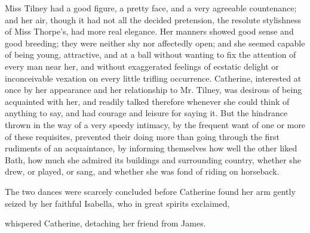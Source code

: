 Miss Tilney had a good figure, a pretty face, and a very agreeable countenance; and her air, though it had not all the decided pretension, the resolute stylishness of Miss Thorpe's, had more real elegance. Her manners showed good sense and good breeding; they were neither shy nor affectedly open; and she seemed capable of being young, attractive, and at a ball without wanting to fix the attention of every man near her, and without exaggerated feelings of ecstatic delight or inconceivable vexation on every little trifling occurrence. Catherine, interested at once by her appearance and her relationship to Mr. Tilney, was desirous of being acquainted with her, and readily talked therefore whenever she could think of anything to say, and had courage and leisure for saying it. But the hindrance thrown in the way of a very speedy intimacy, by the frequent want of one or more of these requisites, prevented their doing more than going through the first rudiments of an acquaintance, by informing themselves how well the other liked Bath, how much she admired its buildings and surrounding country, whether she drew, or played, or sang, and whether she was fond of riding on horseback.

The two dances were scarcely concluded before Catherine found her arm gently seized by her faithful Isabella, who in great spirits exclaimed, 



 whispered Catherine, detaching her friend from James. 


